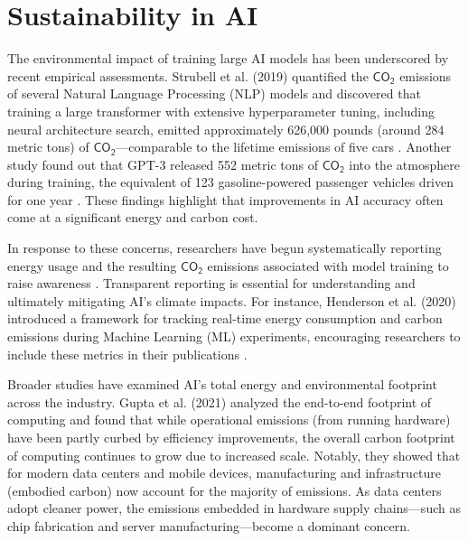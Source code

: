 \documentclass[a4paper,singleside,12pt]{report} %
\begin{document}
\section{Sustainability in AI}

The environmental impact of training large AI models has been underscored by recent empirical assessments. Strubell et al. (2019)
quantified the $\mathsf{CO_2}$ emissions of several Natural Language Processing (NLP) models and discovered that training a large
transformer with extensive hyperparameter tuning, including neural architecture search, emitted approximately 626,000 pounds 
(around 284 metric tons) of $\mathsf{CO_2}$—comparable to the lifetime emissions of five cars \cite{strubell2019energy}. 
Another study found out that GPT-3 released 552 metric tons of $\mathsf{CO_2}$ into the atmosphere during training, the 
equivalent of 123 gasoline-powered passenger vehicles driven for one year \cite{patterson2021carbon}. These findings highlight that 
improvements in AI accuracy often come at a significant energy and carbon cost.

In response to these concerns, researchers have begun systematically reporting energy usage and the resulting $\mathsf{CO_2}$ 
emissions associated with model training to raise awareness \cite{dodge2022carbon, patterson2021carbon}. Transparent reporting 
is essential for understanding and ultimately mitigating AI's climate impacts. For instance, Henderson et al. (2020) introduced 
a framework for tracking real-time energy consumption and carbon emissions during Machine Learning (ML) experiments, encouraging 
researchers to include these metrics in their publications \cite{henderson2020carbon}.

Broader studies have examined AI's total energy and environmental footprint across the industry. Gupta et al. (2021) analyzed 
the end-to-end footprint of computing and found that while operational emissions (from running hardware) have been partly curbed 
by efficiency improvements, the overall carbon footprint of computing continues to grow due to increased scale. Notably, they 
showed that for modern data centers and mobile devices, manufacturing and infrastructure (embodied carbon) now account for the 
majority of emissions. As data centers adopt cleaner power, the emissions embedded in hardware supply chains—such as chip 
fabrication and server manufacturing—become a dominant concern. \cite{gupta2020carbon}
\end{document}
